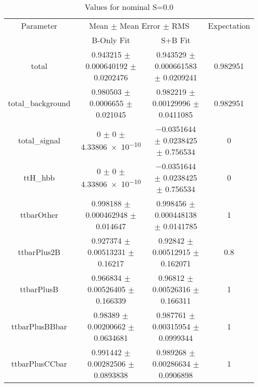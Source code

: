 \begin{table}
\centering
\caption{Values for nominal S=0.0}
\begin{tabular}{cccc}
\toprule
Parameter & \multicolumn{2}{c}{Mean $\pm$ Mean Error $\pm$ RMS} & Expectation\\
 & B-Only Fit & S+B Fit & \\
\midrule
total & \num{0.943215} $\pm$ \num{0.000640192} $\pm$ \num{0.0202476} & \num{0.943529} $\pm$ \num{0.000661583} $\pm$ \num{0.0209241} & \num{0.982951}\\
total\_background & \num{0.980503} $\pm$ \num{0.0006655} $\pm$ \num{0.021045} & \num{0.982219} $\pm$ \num{0.00129996} $\pm$ \num{0.0411085} & \num{0.982951}\\
total\_signal & \num{0} $\pm$ \num{0} $\pm$ \num{4.33806e-10} & \num{-0.0351644} $\pm$ \num{0.0238425} $\pm$ \num{0.756534} & \num{0}\\
ttH\_hbb & \num{0} $\pm$ \num{0} $\pm$ \num{4.33806e-10} & \num{-0.0351644} $\pm$ \num{0.0238425} $\pm$ \num{0.756534} & \num{0}\\
ttbarOther & \num{0.998188} $\pm$ \num{0.000462948} $\pm$ \num{0.014647} & \num{0.998456} $\pm$ \num{0.000448138} $\pm$ \num{0.0141785} & \num{1}\\
ttbarPlus2B & \num{0.927374} $\pm$ \num{0.00513231} $\pm$ \num{0.16217} & \num{0.92842} $\pm$ \num{0.00512915} $\pm$ \num{0.162071} & \num{0.8}\\
ttbarPlusB & \num{0.966834} $\pm$ \num{0.00526405} $\pm$ \num{0.166339} & \num{0.96812} $\pm$ \num{0.00526316} $\pm$ \num{0.166311} & \num{1}\\
ttbarPlusBBbar & \num{0.98389} $\pm$ \num{0.00200662} $\pm$ \num{0.0634681} & \num{0.987761} $\pm$ \num{0.00315954} $\pm$ \num{0.0999344} & \num{1}\\
ttbarPlusCCbar & \num{0.991442} $\pm$ \num{0.00282506} $\pm$ \num{0.0893838} & \num{0.989268} $\pm$ \num{0.00286634} $\pm$ \num{0.0906898} & \num{1}\\
\bottomrule
\end{tabular}
\end{table}